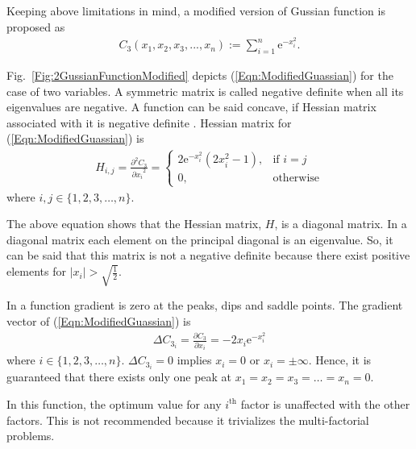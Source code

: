 \documentclass[twocolumn]{svjour3}          %
\newcommand{\me}{\mathrm{e}}
\begin{document}
Keeping above limitations in mind, a modified version of Gussian function is proposed as
\begin{eqnarray}
	C_3(x_1, x_2, x_3, ..., x_n) := \sum_{i=1}^{n}{\me^{-x_i^2}}. \label{Eqn:ModifiedGuassian}
\end{eqnarray}
\par
Fig.~\ref{Fig:2GussianFunctionModified} depicts (\ref{Eqn:ModifiedGuassian}) for the case of two variables. A symmetric matrix is called negative definite when all its eigenvalues are negative. A function can be said concave, if Hessian matrix associated with it is negative definite \cite{bernstein1962some}. Hessian matrix for (\ref{Eqn:ModifiedGuassian}) is 
\begin{eqnarray}
	H_{i,j} = \frac{\partial^2 C_3}{{\partial x_i}^2} =
	\begin{cases}
		2\me^{-x_i^2}(2x_i^2-1)	,	& \text{if } i = j\\
		0						,	& \text{otherwise}
	\end{cases} \label{Eqn:HessianMatrix}
\end{eqnarray}
where $i, j \in \{1, 2, 3, \dots, n\}$.
\par
The above equation shows that the Hessian matrix, $H$, is a diagonal matrix. In a diagonal matrix each element on the principal diagonal is an eigenvalue. So, it can be said that this matrix is not a negative definite because there exist positive elements for $|x_i|>\sqrt{\frac{1}{2}}$.
\par
In a function gradient is zero at the peaks, dips and saddle points. The gradient vector of (\ref{Eqn:ModifiedGuassian}) is
\begin{eqnarray}
	\Delta C_{3_i} = \frac{\partial C_3}{\partial x_i} = -2x_i\me^{-x_i^2} \label{Eqn:GradientModifiedGuassian}
\end{eqnarray}
where $i \in \{1, 2, 3, \dots, n\}$. $\Delta C_{3_i} = 0$ implies $x_i =0$ or $x_i=\pm\infty$. Hence, it is guaranteed that there exists only one peak at $x_1 = x_2 = x_3 = \dots = x_n = 0$.
\par
In this function, the optimum value for any $i^{\text{th}}$ factor is unaffected with the other factors. This is not recommended because it trivializes the multi-factorial problems.
\end{document}
